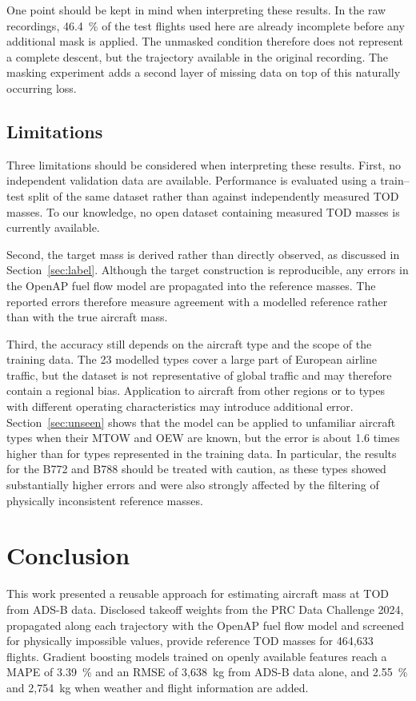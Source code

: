 \documentclass[
  manuscript=proceedings,  %
  layout=preprint,  %
  year=2026,
  volume=x,
]{extra/joas}
\begin{document}
One point should be kept in mind when interpreting these results. In the raw recordings, 46.4~\% of the test flights used here are already incomplete before any additional mask is applied. The unmasked condition therefore does not represent a complete descent, but the trajectory available in the original recording. The masking experiment adds a second layer of missing data on top of this naturally occurring loss.

\subsection{Limitations}
\label{sec:limitations}

Three limitations should be considered when interpreting these results. First, no independent validation data are available. Performance is evaluated using a train--test split of the same dataset rather than against independently measured TOD masses. To our knowledge, no open dataset containing measured TOD masses is currently available.

Second, the target mass is derived rather than directly observed, as discussed in Section~\ref{sec:label}. Although the target construction is reproducible, any errors in the OpenAP fuel flow model are propagated into the reference masses. The reported errors therefore measure agreement with a modelled reference rather than with the true aircraft mass.

Third, the accuracy still depends on the aircraft type and the scope of the training data. The 23 modelled types cover a large part of European airline traffic, but the dataset is not representative of global traffic and may therefore contain a regional bias. Application to aircraft from other regions or to types with different operating characteristics may introduce additional error. Section~\ref{sec:unseen} shows that the model can be applied to unfamiliar aircraft types when their MTOW and OEW are known, but the error is about 1.6 times higher than for types represented in the training data. In particular, the results for the B772 and B788 should be treated with caution, as these types showed substantially higher errors and were also strongly affected by the filtering of physically inconsistent reference masses.

\section{Conclusion}
\label{sec:conclusion}

This work presented a reusable approach for estimating aircraft mass at TOD from ADS-B data. Disclosed takeoff weights from the PRC Data Challenge 2024, propagated along each trajectory with the OpenAP fuel flow model and screened for physically impossible values, provide reference TOD masses for 464{,}633 flights. Gradient boosting models trained on openly available features reach a MAPE of 3.39~\% and an RMSE of 3{,}638~kg from ADS-B data alone, and 2.55~\% and 2{,}754~kg when weather and flight information are added.
\end{document}
